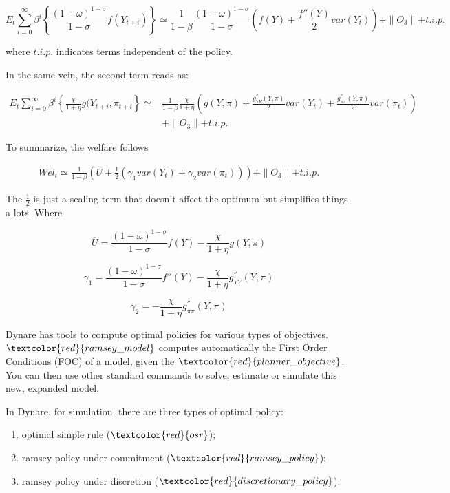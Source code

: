 \documentclass[10pt,math=newtx,citestyle=gb7714-2015,bibstyle=gb7714-2015]{elegantbook}
\begin{document}
{	$$E_t \sum_{i=0}^{\infty}\beta^i\left\{\frac{(1-\omega)^{1-\sigma}}{1-\sigma}f(Y_{t+i})\right\}\simeq \frac{1}{1-\beta}\frac{(1-\omega)^{1-\sigma}}{1-\sigma}\left(f(Y)+\frac{f''(Y)}{2}var(Y_t)\right)+\parallel O_3\parallel+t.i.p.$$
	
	where $t.i.p.$ indicates terms independent of the policy.
	
	In the same vein, the second term reads as:
	
	\begin{equation*}
		\begin{split}
			E_t \sum_{i=0}^{\infty}\beta^i\left\{\frac{\chi}{1+\eta}g(Y_{t+i},\pi_{t+i}\right\}\simeq & \frac{1}{1-\beta}\frac{\chi}{1+\eta}\left(g(Y,\pi)+\frac{g_{YY}^{''}(Y,\pi)}{2}var(Y_t)+\frac{g_{\pi \pi}^{''}(Y,\pi)}{2}var(\pi_t)\right)\\
			&+\parallel O_3\parallel+t.i.p.
		\end{split}
	\end{equation*}
	
	To summarize, the welfare follows
	
	\begin{equation*}
		\begin{split}
			Wel_t \simeq  \frac{1}{1-\beta}\left(\overline{U}+\frac{1}{2}\left(\gamma_1 var(Y_t)+\gamma_2 var(\pi_t)\right) \right)+\parallel O_3\parallel+t.i.p.
		\end{split}
	\end{equation*}
	
	The $\frac{1}{2}$ is just a scaling term that doesn't affect the optimum but simplifies things a lots. Where
	
	$$\overline{U}=\frac{(1-\omega)^{1-\sigma}}{1-\sigma}f(Y)-\frac{\chi}{1+\eta}g(Y,\pi)$$
	
	$$\gamma_1=\frac{(1-\omega)^{1-\sigma}}{1-\sigma}f''(Y)-\frac{\chi}{1+\eta}g_{YY}^{''}(Y,\pi)$$
	
	$$\gamma_2=-\frac{\chi}{1+\eta}g_{\pi \pi}^{''}(Y,\pi)$$
	
	Dynare has tools to compute optimal policies for various types of objectives. $\textcolor{red}{ramsey\_model}$ computes automatically the First Order Conditions (FOC) of a model, given the $\textcolor{red}{planner\_objective}$. You can then use other standard commands to solve, estimate or simulate this new, expanded model.
	
	In Dynare, for simulation, there are three types of optimal policy:
	
	\begin{enumerate}
		\item optimal simple rule ($\textcolor{red}{osr}$);
		\item ramsey policy under commitment ($\textcolor{red}{ramsey\_policy}$);
		\item ramsey policy under discretion ($\textcolor{red}{discretionary\_policy}$).
	\end{enumerate}
	
}
\end{document}
